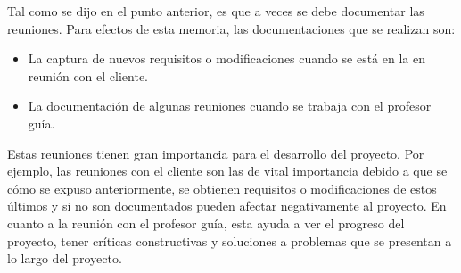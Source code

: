 Tal como se dijo en el punto anterior, es que a veces se debe documentar las reuniones. Para efectos de esta memoria, las documentaciones que se realizan son:

\begin{itemize}
    \item La captura de nuevos requisitos o modificaciones cuando se está en la en reunión con el cliente.
    \item La documentación de algunas reuniones cuando se trabaja con el profesor guía.
\end{itemize} 

Estas reuniones tienen gran importancia para el desarrollo del proyecto. Por ejemplo, las reuniones con el cliente son las de vital importancia debido a que se cómo se expuso anteriormente, se obtienen requisitos o modificaciones de estos últimos y si no son documentados pueden afectar negativamente al proyecto. En cuanto a la reunión con el profesor guía, esta ayuda a ver el progreso del proyecto, tener críticas constructivas y soluciones a problemas que se presentan a lo largo del proyecto.
